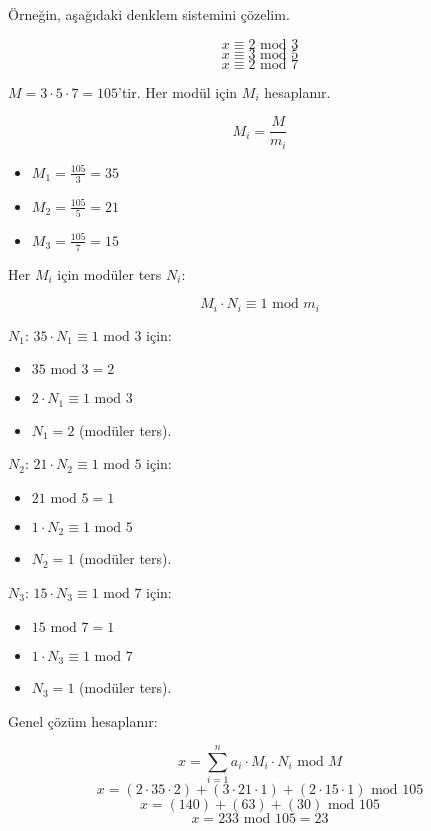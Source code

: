 Örneğin, aşağıdaki denklem sistemini çözelim.

\[ x \equiv 2 \text{ mod } 3 \]
\[ x \equiv 3 \text{ mod } 5 \]
\[ x \equiv 2 \text{ mod } 7 \]

$M = 3 \cdot 5 \cdot 7 = 105$'tir. Her modül için $M_i$ hesaplanır.

\[ M_i = \frac{M}{m_i} \]

\begin{itemize}
    \item $M_1 = \frac{105}{3} = 35$
    \item $M_2 = \frac{105}{5} = 21$
    \item $M_3 = \frac{105}{7} = 15$
\end{itemize}

Her $M_i$ için modüler ters $N_i$:

\[ M_i \cdot N_i \equiv 1 \text{ mod } m_i \]

$N_1$: $35 \cdot N_1 \equiv 1 \text{ mod } 3$ için:

\begin{itemize}
    \item $35 \text{ mod } 3 = 2$
    \item $2 \cdot N_1 \equiv 1 \text{ mod } 3$
    \item $N_1 = 2$ (modüler ters).
\end{itemize}

$N_2$: $21 \cdot N_2 \equiv 1 \text{ mod } 5$ için:

\begin{itemize}
    \item $21 \text{ mod } 5 = 1$
    \item $1 \cdot N_2 \equiv 1 \text{ mod } 5$
    \item $N_2 = 1$ (modüler ters).
\end{itemize}

$N_3$: $15 \cdot N_3 \equiv 1 \text{ mod } 7$ için:

\begin{itemize}
    \item $15 \text{ mod } 7 = 1$
    \item $1 \cdot N_3 \equiv 1 \text{ mod } 7$
    \item $N_3 = 1$ (modüler ters).
\end{itemize}

Genel çözüm hesaplanır:

\[ x = \sum_{i=1}^{n} a_i \cdot M_i \cdot N_i \text{ mod } M \]
\[ x = (2 \cdot 35 \cdot 2) + (3 \cdot 21 \cdot 1) + (2 \cdot 15 \cdot 1) \text{ mod } 105 \]
\[ x = (140) + (63) + (30) \text{ mod } 105 \]
\[ x = 233 \text{ mod } 105 = 23 \]

